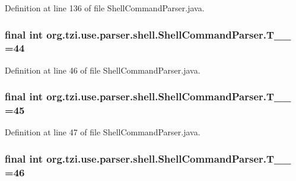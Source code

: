 Definition at line 136 of file Shell\-Command\-Parser.\-java.

\hypertarget{classorg_1_1tzi_1_1use_1_1parser_1_1shell_1_1_shell_command_parser_a2759d393fe3ded6de578ed70fb8ec06c}{
\subsubsection[{T\-\_\-\-\_\-44}]{\setlength{\rightskip}{0pt plus 5cm}final int org.\-tzi.\-use.\-parser.\-shell.\-Shell\-Command\-Parser.\-T\-\_\-\-\_ =44\hspace{0.3cm}{\ttfamily [static]}}}\label{classorg_1_1tzi_1_1use_1_1parser_1_1shell_1_1_shell_command_parser_a2759d393fe3ded6de578ed70fb8ec06c}


Definition at line 46 of file Shell\-Command\-Parser.\-java.

\hypertarget{classorg_1_1tzi_1_1use_1_1parser_1_1shell_1_1_shell_command_parser_a9cca9336f57f1d6b38f737138c0e1a79}{
\subsubsection[{T\-\_\-\-\_\-45}]{\setlength{\rightskip}{0pt plus 5cm}final int org.\-tzi.\-use.\-parser.\-shell.\-Shell\-Command\-Parser.\-T\-\_\-\-\_ =45\hspace{0.3cm}{\ttfamily [static]}}}\label{classorg_1_1tzi_1_1use_1_1parser_1_1shell_1_1_shell_command_parser_a9cca9336f57f1d6b38f737138c0e1a79}


Definition at line 47 of file Shell\-Command\-Parser.\-java.

\hypertarget{classorg_1_1tzi_1_1use_1_1parser_1_1shell_1_1_shell_command_parser_a980ed0fd0e061347b0d51bbcea4fc350}{
\subsubsection[{T\-\_\-\-\_\-46}]{\setlength{\rightskip}{0pt plus 5cm}final int org.\-tzi.\-use.\-parser.\-shell.\-Shell\-Command\-Parser.\-T\-\_\-\-\_ =46\hspace{0.3cm}{\ttfamily [static]}}}\label{classorg_1_1tzi_1_1use_1_1parser_1_1shell_1_1_shell_command_parser_a980ed0fd0e061347b0d51bbcea4fc350}


